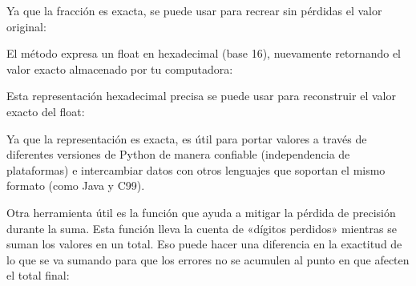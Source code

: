 \documentclass[a4,10pt,spanish]{sphinxmanual}
\begin{document}
\begin{sphinxVerbatim}[commandchars=\\\{\}]
  
\end{sphinxVerbatim}

\sphinxAtStartPar
Ya que la fracción es exacta, se puede usar para recrear sin pérdidas el valor original:

\begin{sphinxVerbatim}[commandchars=\\\{\}]
    
\end{sphinxVerbatim}

\sphinxAtStartPar
El método  expresa un float en hexadecimal (base 16), nuevamente retornando el valor exacto almacenado por tu computadora:

\begin{sphinxVerbatim}[commandchars=\\\{\}]
\end{sphinxVerbatim}

\sphinxAtStartPar
Esta representación hexadecimal precisa se puede usar para reconstruir el valor exacto del float:

\begin{sphinxVerbatim}[commandchars=\\\{\}]
  
\end{sphinxVerbatim}

\sphinxAtStartPar
Ya que la representación es exacta, es útil para portar valores a través de diferentes versiones de Python de manera confiable (independencia de plataformas) e intercambiar datos con otros lenguajes que soportan el mismo formato (como Java y C99).

\sphinxAtStartPar
Otra herramienta útil es la función  que ayuda a mitigar la pérdida de precisión durante la suma.  Esta función lleva la cuenta de «dígitos perdidos» mientras se suman los valores en un total.  Eso puede hacer una diferencia en la exactitud de lo que se va sumando para que los errores no se acumulen al punto en que afecten el total final:
\end{document}
